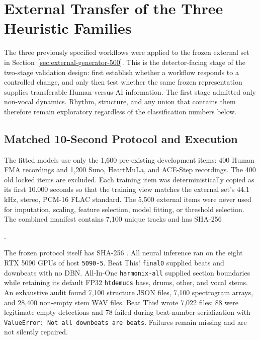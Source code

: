 \section{External Transfer of the Three Heuristic Families}
\label{sec:external-500-heuristics}

The three previously specified workflows were applied to the frozen external
set in Section~\ref{sec:external-generator-500}. This is the detector-facing
stage of the two-stage validation design: first establish whether a workflow
responds to a controlled change, and only then test whether the same frozen
representation supplies transferable Human-versus-AI information. The first
stage admitted only non-vocal dynamics. Rhythm, structure, and any union that
contains them therefore remain exploratory regardless of the classification
numbers below.

\subsection{Matched 10-Second Protocol and Execution}

The fitted models use only the 1,600 pre-existing development items: 400 Human
FMA recordings and 1,200 Suno, HeartMuLa, and ACE-Step recordings. The 400 old
locked items are excluded. Each training item was deterministically copied as
its first 10.000 seconds so that the training view matches the external set's
44.1 kHz, stereo, PCM-16 FLAC standard. The 5,500 external items were never
used for imputation, scaling, feature selection, model fitting, or threshold
selection. The combined manifest contains 7,100 unique tracks and has SHA-256

\begin{center}
\small
{}.
\end{center}

The frozen protocol itself has SHA-256
.
All neural inference ran on the eight RTX 5090 GPUs of host \texttt{5090-5}.
Beat This! \texttt{final0} supplied beats and downbeats with no DBN. All-In-One
\texttt{harmonix-all} supplied section boundaries while retaining its default
FP32 \texttt{htdemucs} bass, drums, other, and vocal stems. An exhaustive audit
found 7,100 structure JSON files, 7,100 spectrogram arrays, and 28,400 non-empty
stem WAV files. Beat This! wrote 7,022 files: 88 were legitimate empty
detections and 78 failed during beat-number serialization with
\texttt{ValueError: Not all downbeats are beats}. Failures remain missing and
are not silently repaired.

